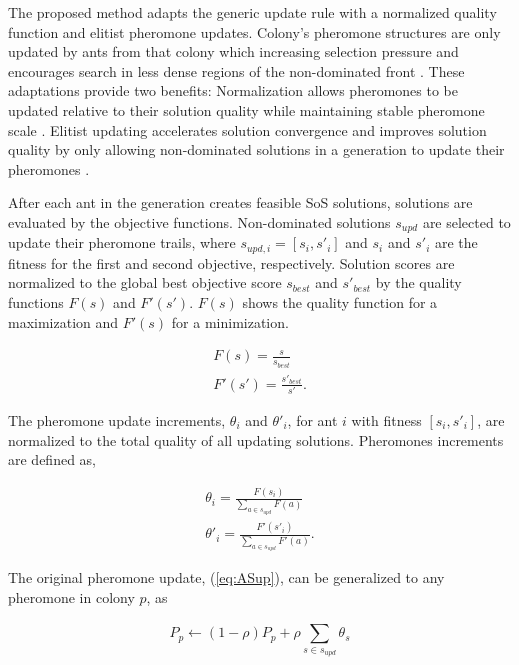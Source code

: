 \documentclass[preprint,12pt]{elsarticle}
\begin{document}
The proposed method adapts the generic update rule with a normalized quality function and elitist pheromone updates. Colony's pheromone structures are only updated by ants from that colony which increasing selection pressure and encourages search in less dense regions of the non-dominated front \citep{Iredi2001}. These adaptations provide two benefits: Normalization allows pheromones to be updated relative to their solution quality while maintaining stable pheromone scale \citep{Blum2004}. Elitist updating accelerates solution convergence and improves solution quality by only allowing non-dominated solutions in a generation to update their pheromones \citep{Iredi2001}. 

After each ant in the generation creates feasible SoS solutions, solutions are evaluated by the objective functions. Non-dominated solutions $s_{upd}$ are selected to update their pheromone trails, where $s_{upd,i}=[s_i,s'_i]$ and $s_i$ and $s'_i$ are the fitness for the first and second objective, respectively. Solution scores are normalized to the global best objective score $s_{best}$ and $s'_{best}$ by the quality functions $F(s)$ and $F'(s')$. $F(s)$ shows the quality function for a maximization and $F'(s)$ for a minimization.

\begin{equation}
\begin{split}
F(s)=\frac{s}{s_{best}}\\
F'(s')=\frac{s'_{best}}{s'}.
\end{split}
\label{eq:Qual}
\end{equation}

The pheromone update increments, $\theta_i$ and $\theta'_i$, for ant $i$ with fitness $[s_i,s'_i]$, are normalized to the total quality of all updating solutions. Pheromones increments are defined as,

\begin{equation}
\begin{split}
\theta_i=\frac{F(s_i)}{\sum_{a\in s_{upd}}^{}F(a)}\\
\theta'_i=\frac{F'(s'_i)}{\sum_{a\in s_{upd}}^{}F'(a)}.
\end{split}
\label{eq:Inc}
\end{equation}

The original pheromone update, (\ref{eq:ASup}), can be generalized to any pheromone in colony $p$, as

\begin{equation}
P_p \leftarrow (1-\rho)P_p+\rho\sum_{s \in s_{upd}}^{}\theta_s
\label{eq:Up}
\end{equation} 
\end{document}
